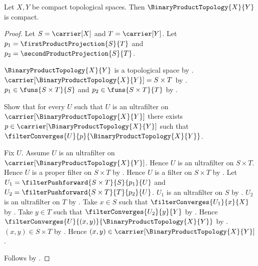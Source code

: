 \begin{theorem}\label{binary_product_of_compact_spaces_is_compact}
    Let $X,Y$ be compact topological spaces.
    Then $\BinaryProductTopology{X}{Y}$ is compact.
\end{theorem}
\begin{proof}
    Let $S=\carrier[X]$ and $T=\carrier[Y]$.
    Let $p_1=\firstProductProjection{S}{T}$ and
        $p_2=\secondProductProjection{S}{T}$.

    $\BinaryProductTopology{X}{Y}$ is a topological space by
        .
    $\carrier[\BinaryProductTopology{X}{Y}]=S\times T$ by
        .
    $p_1\in\funs{S\times T}{S}$ and
        $p_2\in\funs{S\times T}{T}$ by
        .

    Show that for every $U$ such that
        $U$ is an ultrafilter on
            $\carrier[\BinaryProductTopology{X}{Y}]$ there exists
        $p\in\carrier[\BinaryProductTopology{X}{Y}]$ such that
            $\filterConverges{U}{p}{\BinaryProductTopology{X}{Y}}$.
    \begin{subproof}
        Fix $U$.
        Assume $U$ is an ultrafilter on
            $\carrier[\BinaryProductTopology{X}{Y}]$.
        Hence $U$ is an ultrafilter on $S\times T$.
        Hence $U$ is a proper filter on $S\times T$ by
            .
        Hence $U$ is a filter on $S\times T$ by
            .
        Let $U_1=\filterPushforward{S\times T}{S}{p_1}{U}$ and
            $U_2=\filterPushforward{S\times T}{T}{p_2}{U}$.
        $U_1$ is an ultrafilter on $S$ by
            .
        $U_2$ is an ultrafilter on $T$ by
            .
        Take $x\in S$ such that $\filterConverges{U_1}{x}{X}$ by
            .
        Take $y\in T$ such that $\filterConverges{U_2}{y}{Y}$ by
            .
        Hence $\filterConverges{U}{(x,y)}{
            \BinaryProductTopology{X}{Y}}$ by
            .
        $(x,y)\in S\times T$ by .
        Hence $(x,y)\in\carrier[\BinaryProductTopology{X}{Y}]$.
    \end{subproof}
    Follows by .
\end{proof}
